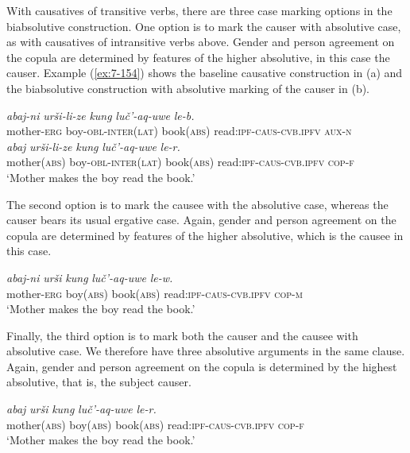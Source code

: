 ﻿\documentclass[output=paper]{langsci/langscibook}
\begin{document}
With causatives of transitive verbs, there are three case
marking options in the biabsolutive construction. One option is to mark the
causer with absolutive case, as with causatives of intransitive verbs
above. Gender and person agreement on the copula are determined by
features of the higher absolutive, in this case the causer. Example
(\ref{ex:7-154}) shows the baseline causative construction in (a) and the
biabsolutive construction with  absolutive marking of the causer in
(b).

\ea\label{ex:7-154}
\ea %
\gll \emph{abaj-ni} \emph{urši-li-ze} \emph{kung} \emph{luč'-aq-uwe} \emph{le-b.}\\
mother-\textsc{erg} boy-\textsc{obl}-\textsc{inter(lat)} book(\textsc{abs}) read:\textsc{ipf}-\textsc{caus}-\textsc{cvb.ipfv} \textsc{aux}-\textsc{n}\\

\ex %
\gll \emph{abaj} \emph{urši-li-ze} \emph{kung} \emph{luč'-aq-uwe} \emph{le-r.}\\
mother(\textsc{abs}) boy-\textsc{obl}-\textsc{inter(lat)} book(\textsc{abs}) read:\textsc{ipf}-\textsc{caus}-\textsc{cvb.ipfv} \textsc{cop}-\textsc{f}\\
\glt `Mother makes the boy read the book.'
\z
\z

The second option is to mark the causee with the absolutive case,
whereas the causer bears its usual ergative case. Again, gender and
person agreement on the copula are determined by features of the higher
absolutive, which is the causee in this case.

\addtocounter{equation}{-1}
\ea\label{ex:7-154c} 
\begin{xlist}
\gll \emph{abaj-ni} \emph{urši} \emph{kung} \emph{luč'-aq-uwe} \emph{le-w.}\\
mother-\textsc{erg} boy(\textsc{abs}) book(\textsc{abs}) read:\textsc{ipf}-\textsc{caus}-\textsc{cvb.ipfv} \textsc{cop}-\textsc{m}\\
\glt `Mother makes the boy read the book.'
\end{xlist}
\z

Finally, the third option is to mark both the causer and the causee with
absolutive case. We therefore have three absolutive arguments in the
same clause. Again, gender and person agreement on the copula is
determined by the highest absolutive, that is, the subject causer.

\addtocounter{equation}{-1}
\ea\label{ex:7-154d}
\begin{xlist}
\gll \emph{abaj} \emph{urši} \emph{kung} \emph{luč'-aq-uwe} \emph{le-r.}\\
mother(\textsc{abs}) boy(\textsc{abs}) book(\textsc{abs}) read:\textsc{ipf}-\textsc{caus}-\textsc{cvb.ipfv} \textsc{cop}-\textsc{f}\\
\glt `Mother makes the boy read the book.'
\end{xlist}
\z
\end{document}
